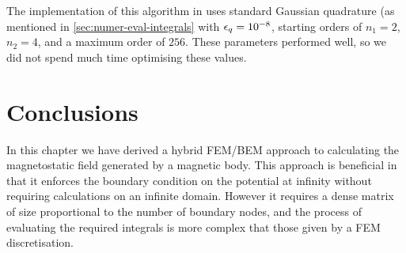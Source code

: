 The implementation of this algorithm in \oomph uses standard Gaussian quadrature (as mentioned in \cref{sec:numer-eval-integrals} with $\epsilon_q = 10^{-8}$, starting orders of $n_1=2$, $n_2=4$, and a maximum order of $256$.
These parameters performed well, so we did not spend much time optimising these values.









\section{Conclusions}

In this chapter we have derived a hybrid FEM/BEM approach to calculating the magnetostatic field generated by a magnetic body.
This approach is beneficial in that it enforces the boundary condition on the potential at infinity without requiring calculations on an infinite domain.
However it requires a dense matrix of size proportional to the number of boundary nodes, and the process of evaluating the required integrals is more complex that those given by a FEM discretisation.

